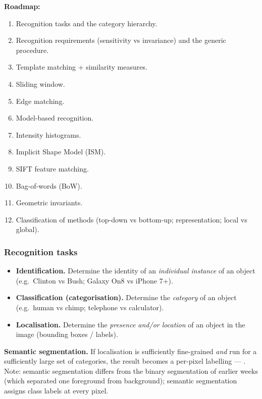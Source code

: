 \textbf{Roadmap:}
\begin{enumerate}
  \item Recognition tasks and the category hierarchy.
  \item Recognition requirements (sensitivity vs invariance) and the generic procedure.
  \item Template matching + similarity measures.
  \item Sliding window.
  \item Edge matching.
  \item Model-based recognition.
  \item Intensity histograms.
  \item Implicit Shape Model (ISM).
  \item SIFT feature matching.
  \item Bag-of-words (BoW).
  \item Geometric invariants.
  \item Classification of methods (top-down vs bottom-up; representation; local vs global).
\end{enumerate}

\bigseparator

\subsubsection{Recognition tasks}

\begin{defbox}
\begin{itemize}
  \item \textbf{Identification.} Determine the identity of an \emph{individual instance} of an object (e.g.\ Clinton vs Bush; Galaxy On8 vs iPhone 7+).
  \item \textbf{Classification (categorisation).} Determine the \emph{category} of an object (e.g.\ human vs chimp; telephone vs calculator).
  \item \textbf{Localisation.} Determine the \emph{presence and/or location} of an object in the image (bounding boxes / labels).
\end{itemize}
\end{defbox}

\textbf{Semantic segmentation.} If localisation is sufficiently fine-grained \emph{and} run for a sufficiently large set of categories, the result becomes a per-pixel labelling — . Note: semantic segmentation differs from the binary segmentation of earlier weeks (which separated one foreground from background); semantic segmentation assigns class labels at every pixel.

